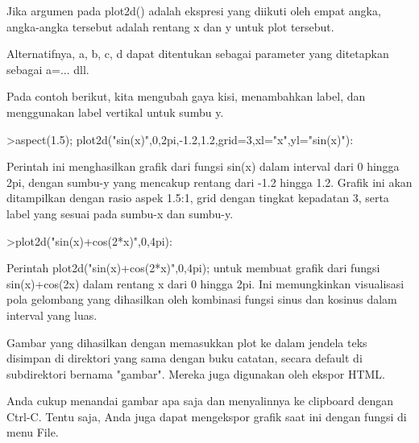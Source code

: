 \documentclass{article}
\begin{document}
\begin{eulernotebook}
\begin{eulercomment}
\begin{eulercomment}
\begin{eulercomment}
\begin{eulercomment}
\begin{eulercomment}
Jika argumen pada plot2d() adalah ekspresi yang diikuti oleh empat
angka, angka-angka tersebut adalah rentang x dan y untuk plot
tersebut.

Alternatifnya, a, b, c, d dapat ditentukan sebagai parameter yang
ditetapkan sebagai a=... dll.

Pada contoh berikut, kita mengubah gaya kisi, menambahkan label, dan
menggunakan label vertikal untuk sumbu y.
\end{eulercomment}
\begin{eulerprompt}
>aspect(1.5); plot2d("sin(x)",0,2pi,-1.2,1.2,grid=3,xl="x",yl="sin(x)"):
\end{eulerprompt}
\begin{eulercomment}
Perintah ini menghasilkan grafik dari fungsi sin(x) dalam interval
dari 0 hingga 2pi, dengan sumbu-y yang mencakup rentang dari -1.2
hingga 1.2. Grafik ini akan ditampilkan dengan rasio aspek 1.5:1, grid
dengan tingkat kepadatan 3, serta label yang sesuai pada sumbu-x dan
sumbu-y.
\end{eulercomment}
\begin{eulerprompt}
>plot2d("sin(x)+cos(2*x)",0,4pi):
\end{eulerprompt}
\begin{eulercomment}
Perintah plot2d("sin(x)+cos(2*x)",0,4pi); untuk membuat grafik dari
fungsi sin(x)+cos(2x) dalam rentang x dari 0 hingga 2pi. Ini
memungkinkan visualisasi pola gelombang yang dihasilkan oleh kombinasi
fungsi sinus dan kosinus dalam interval yang luas.

Gambar yang dihasilkan dengan memasukkan plot ke dalam jendela teks
disimpan di direktori yang sama dengan buku catatan, secara default di
subdirektori bernama "gambar". Mereka juga digunakan oleh ekspor HTML.

Anda cukup menandai gambar apa saja dan menyalinnya ke clipboard
dengan Ctrl-C. Tentu saja, Anda juga dapat mengekspor grafik saat ini
dengan fungsi di menu File.


\end{eulercomment}
\end{eulercomment}
\end{eulercomment}
\end{eulercomment}
\end{eulercomment}
\end{eulernotebook}
\end{document}
